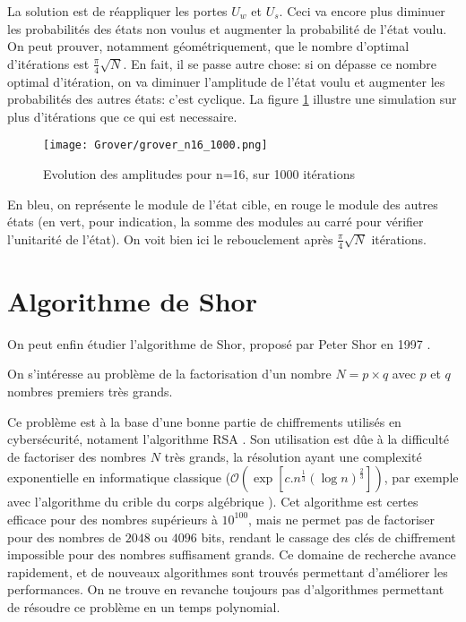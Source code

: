 La solution est de réappliquer les portes $U_w$ et $U_s$. Ceci va encore plus diminuer les probabilités des états non voulus et augmenter la probabilité de l'état voulu.
On peut prouver, notamment géométriquement, que le nombre d'optimal d'itérations est $\frac{\pi}{4}\sqrt{N}$. En fait, il se passe autre chose: si on dépasse ce nombre optimal d'itération, on va diminuer l'amplitude de l'état voulu et augmenter les probabilités des autres états: c'est cyclique. La figure \ref{fig:groverGraph} illustre une simulation sur plus d'itérations que ce qui est necessaire.

\begin{figure}[h]
  \centering
  \texttt{[image: Grover/grover\_n16\_1000.png]}
  \caption{Evolution des amplitudes pour n=16, sur 1000 itérations}
  \label{fig:groverGraph}
\end{figure}

En bleu, on représente le module de l'état cible, en rouge le module des autres états (en vert, pour indication, la somme des modules au carré pour vérifier l'unitarité de l'état). On voit bien ici le rebouclement après $\frac{\pi}{4}\sqrt{N}$ itérations.

\section{Algorithme de Shor}

On peut enfin étudier l'algorithme de Shor, proposé par Peter Shor en 1997 \cite{Shor97}.

\begin{pb}
  On s'intéresse au problème de la factorisation d'un nombre $N=p \times q$ avec $p$ et $q$ nombres premiers très grands.
\end{pb}

Ce problème est à la base d'une bonne partie de chiffrements utilisés en cybersécurité, notament l'algorithme RSA \cite{RSA}. Son utilisation est dûe à la difficulté de factoriser des nombres $N$ très grands, la résolution ayant une complexité exponentielle en informatique classique ($\mathcal{O}(\exp{[c . n^{\frac{1}{3}} (\log n)^{\frac{2}{3}} ]})$, par exemple avec l'algorithme du crible du corps algébrique \cite{NFS-RSA220}). Cet algorithme est certes efficace pour des nombres supérieurs à $10^{100}$, mais ne permet pas de factoriser pour des nombres de $2048$ ou $4096$ bits, rendant le cassage des clés de chiffrement impossible pour des nombres suffisament grands. Ce domaine de recherche avance rapidement, et de nouveaux algorithmes sont trouvés permettant d'améliorer les performances. On ne trouve en revanche toujours pas d'algorithmes permettant de résoudre ce problème en un temps polynomial.


